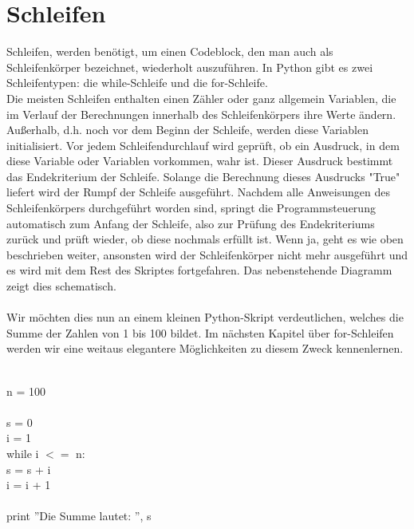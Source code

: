 \section{Schleifen}
Schleifen, werden benötigt, um einen Codeblock, den man auch als Schleifenkörper bezeichnet, wiederholt auszuführen. In Python gibt es zwei Schleifentypen: die while-Schleife und die for-Schleife. \\
Die meisten Schleifen enthalten einen Zähler oder ganz allgemein Variablen, die im Verlauf der Berechnungen innerhalb des Schleifenkörpers ihre Werte ändern. Außerhalb, d.h. noch vor dem Beginn der Schleife, werden diese Variablen initialisiert. Vor jedem Schleifendurchlauf wird geprüft, ob ein Ausdruck, in dem diese Variable oder Variablen vorkommen, wahr ist. Dieser Ausdruck bestimmt das Endekriterium der Schleife. Solange die Berechnung dieses Ausdrucks "True" liefert wird der Rumpf der Schleife ausgeführt. Nachdem alle Anweisungen des Schleifenkörpers durchgeführt worden sind, springt die Programmsteuerung automatisch zum Anfang der Schleife, also zur Prüfung des Endekriteriums zurück und prüft wieder, ob diese nochmals erfüllt ist.
Wenn ja, geht es wie oben beschrieben weiter, ansonsten wird der Schleifenkörper nicht mehr ausgeführt und es wird mit dem Rest des Skriptes fortgefahren. Das nebenstehende Diagramm zeigt dies schematisch. \\
\\
Wir möchten dies nun an einem kleinen Python-Skript verdeutlichen, welches die Summe der Zahlen von 1 bis 100 bildet. Im nächsten Kapitel über for-Schleifen werden wir eine weitaus elegantere Möglichkeiten zu diesem Zweck kennenlernen. \\
\\
\begin{MyConsoleBox}{
n = 100 \\
\\
s = 0 \\
i = 1 \\
while i $<=$ n: \\
\hspace{0.5cm}    s = s + i \\
\hspace{0.5cm}    i = i + 1 \\
\\
print ''Die Summe lautet: '', s \\
}\end{MyConsoleBox}
\\
